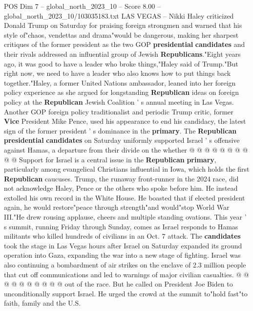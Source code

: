 \begin{textsample}{POS Dim 7 – global\_north\_2023\_10 – Score 8.00 – global\_north\_2023\_10/103035183.txt}  \label{ex:f7_pos_248}
LAS VEGAS -- Nikki Haley criticized Donald Trump on Saturday for praising foreign strongmen and warned that his style of"chaos, vendettas and drama"would be dangerous, making her sharpest critiques of the former president as the two GOP \textbf{presidential} \textbf{candidates} and their rivals addressed an influential group of Jewish \textbf{Republicans}."Eight years ago, it was good to have a leader who broke things,"Haley said of Trump."But right now, we need to have a leader who also knows how to put things back together."Haley, a former United Nations ambassador, leaned into her foreign policy experience as she argued for longstanding \textbf{Republican} ideas on foreign policy at the \textbf{Republican} Jewish Coalition ' s annual meeting in Las Vegas.
Another GOP foreign policy traditionalist and periodic Trump critic, former \textbf{Vice} President Mike Pence, used his appearance to end his candidacy, the latest sign of the former president ' s dominance in the \textbf{primary}.
The \textbf{Republican} \textbf{presidential} \textbf{candidates} on Saturday uniformly supported Israel ' s offensive against Hamas, a departure from their divide on the whether @ @ @ @ @ @ @ @ @ @ Support for Israel is a central issue in the \textbf{Republican} \textbf{primary}, particularly among evangelical Christians influential in Iowa, which holds the first \textbf{Republican} caucuses.
Trump, the runaway front-runner in the 2024 race, did not acknowledge Haley, Pence or the others who spoke before him.
He instead extolled his own record in the White House.
He boasted that if elected president again, he would restore"peace through strength"and would"stop World War III."He drew rousing applause, cheers and multiple standing ovations.
This year ' s summit, running Friday through Sunday, comes as Israel responds to Hamas militants who killed hundreds of civilians in an Oct. 7 attack.
The \textbf{candidates} took the stage in Las Vegas hours after Israel on Saturday expanded its ground operation into Gaza, expanding the war into a new stage of fighting.
Israel was also continuing a bombardment of air strikes on the enclave of 2.3 million people that cut off communications and led to warnings of major civilian casualties. @ @ @ @ @ @ @ @ @ @ out of the race.
But he called on President Joe Biden to unconditionally support Israel.
He urged the crowd at the summit to"hold fast"to faith, family and the U.S.

\end{textsample}
